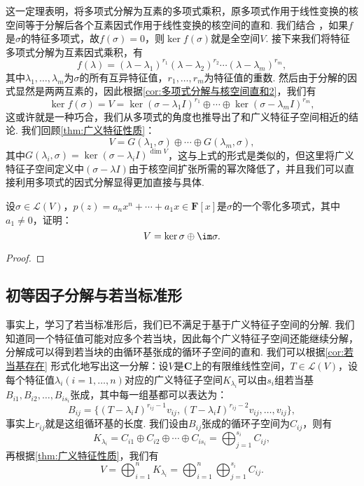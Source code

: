 这一定理表明，将多项式分解为互素的多项式乘积，原多项式作用于线性变换的核空间等于分解后各个互素因式作用于线性变换的核空间的直和. 我们结合 ，如果$f$是$\sigma$的特征多项式，故$f(\sigma)=0$，则$\ker f(\sigma)$就是全空间$V$. 接下来我们将特征多项式分解为互素因式乘积，有
\[f(\lambda)=(\lambda-\lambda_1)^{r_1}(\lambda-\lambda_2)^{r_2}\cdots(\lambda-\lambda_m)^{r_m},\]
其中$\lambda_1,\ldots,\lambda_m$为$\sigma$的所有互异特征值，$r_1,\ldots,r_m$为特征值的重数. 然后由于分解的因式显然是两两互素的，因此根据\autoref{cor:多项式分解与核空间直和2}，我们有
\[\ker f(\sigma)=V=\ker (\sigma-\lambda_1I)^{r_1}\oplus\cdots\oplus\ker (\sigma-\lambda_mI)^{r_m},\]
这或许就是一种巧合，我们从多项式的角度也推导出了和广义特征子空间相近的结论. 我们回顾\autoref{thm:广义特征性质}：
\[V=G(\lambda_1,\sigma)\oplus\cdots\oplus G(\lambda_m,\sigma),\]
其中$G(\lambda_i,\sigma)=\ker (\sigma-\lambda_iI)^{\dim V}$，这与上式的形式是类似的，但这里将广义特征子空间定义中$(\sigma-\lambda I)$由于核空间扩张所需的幂次降低了，并且我们可以直接利用多项式的因式分解显得更加直接与具体.
\begin{example}{}{}
    设$\sigma\in \mathcal{L}(V)$，$p(z)=a_nx^n+\cdots+a_1x\in\mathbf{F}[x]$是$\sigma$的一个零化多项式，其中$a_1\neq 0$，证明：
    \[V=\ker \sigma\oplus\im\sigma.\]
\end{example}

\begin{proof}

\end{proof}

\subsection{初等因子分解与若当标准形}
事实上，学习了若当标准形后，我们已不满足于基于广义特征子空间的分解. 我们知道同一个特征值可能对应多个若当块，因此每个广义特征子空间还能继续分解，分解成可以得到若当块的由循环基张成的循环子空间的直和. 我们可以根据\autoref{cor:若当基存在} 形式化地写出这一分解：设$V$是$\mathbf{C}$上的有限维线性空间，$T\in\mathcal{L}(V)$，设每个特征值$\lambda_i(i=1,\ldots,n)$对应的广义特征子空间$K_{\lambda_i}$可以由$s_i$组若当基$B_{i1},B_{i2},\ldots,B_{is_i}$张成，其中每一组基都可以表达为：
\[B_{ij}=\{(T-\lambda_iI)^{r_{ij}-1}v_{ij},(T-\lambda_iI)^{r_{ij}-2}v_{ij},\ldots,v_{ij}\},\]
事实上$r_{ij}$就是这组循环基的长度. 我们设由$B_{ij}$张成的循环子空间为$C_{ij}$，则有
\[K_{\lambda_i}=C_{i1}\oplus C_{i2}\oplus\cdots\oplus C_{is_i}=\bigoplus_{j=1}^{s_i} C_{ij},\]
再根据\autoref{thm:广义特征性质}，我们有
\begin{equation} \label{eq:19:循环子空间分解}
    V=\bigoplus_{i=1}^n K_{\lambda_i}=\bigoplus_{i=1}^n\bigoplus_{j=1}^{s_i} C_{ij}.
\end{equation}

